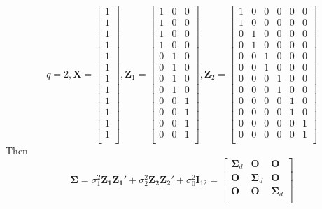 			\[
			q = 2,  \bm X = \left[
			\begin{array}{c}
			1\\
			1\\
			1\\
			1\\
			1\\
			1\\
			1\\
			1\\
			1\\
			1\\
			1\\
			1\\
			\end{array}
			\right],
			\bm Z_1=\left[
			\begin{array}{ccc}
			1 & 0 & 0 \\
			1 & 0 & 0 \\
			1 & 0 & 0 \\
			1 & 0 & 0 \\
			0 & 1 & 0 \\
			0 & 1 & 0 \\
			0 & 1 & 0 \\
			0 & 1 & 0 \\
			0 & 0 & 1 \\
			0 & 0 & 1 \\
			0 & 0 & 1 \\
			0 & 0 & 1 \\
			\end{array}
			\right],
			\bm Z_2=\left[
			\begin{array}{cccccc}
			1 & 0 & 0  & 0 & 0  &0\\
			1 & 0 & 0  & 0 & 0  &0\\
			0 & 1 & 0  & 0 & 0  &0\\
			0 & 1 & 0  & 0 & 0  &0\\
			0 & 0 & 1  & 0 & 0  &0\\
			0 & 0 & 1  & 0 & 0  &0\\
			0 & 0 & 0  & 1 & 0  &0\\
			0 & 0 & 0  & 1 & 0  &0\\
			0 & 0 & 0  & 0 & 1  &0\\
			0 & 0 & 0  & 0 & 1  &0\\
			0 & 0 & 0  & 0 & 0  &1\\
			0 & 0 & 0  & 0 & 0  &1\\
			\end{array}
			\right]
			\]
	Then 
		\[\bm\Sigma = \sigma_1^2\bm{Z_1Z_1'} + \sigma_2^2\bm{Z_2Z_2'} + \sigma_0^2\bm I_{12}=
		\left[
		\begin{array}{ccc}
		\bm\Sigma_d  & \bm O  &\bm O\\
		\bm O & \bm\Sigma_d  & \bm O \\
		\bm O  &\bm O   & \bm\Sigma_d\\
		\end{array}
		\right]\]
